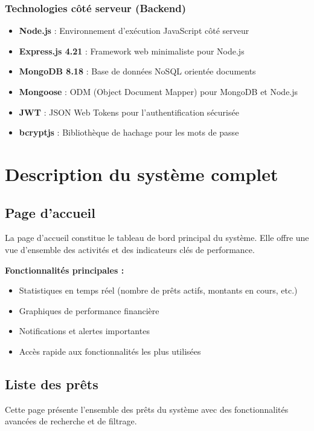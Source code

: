 \documentclass[12pt,a4paper]{report}
\begin{document}
\subsubsection{Technologies côté serveur (Backend)}
\begin{itemize}
    \item \textbf{Node.js} : Environnement d'exécution JavaScript côté serveur
    \item \textbf{Express.js 4.21} : Framework web minimaliste pour Node.js
    \item \textbf{MongoDB 8.18} : Base de données NoSQL orientée documents
    \item \textbf{Mongoose} : ODM (Object Document Mapper) pour MongoDB et Node.js
    \item \textbf{JWT} : JSON Web Tokens pour l'authentification sécurisée
    \item \textbf{bcryptjs} : Bibliothèque de hachage pour les mots de passe
\end{itemize}

\section{Description du système complet}

\subsection{Page d'accueil}

La page d'accueil constitue le tableau de bord principal du système. Elle offre une vue d'ensemble des activités et des indicateurs clés de performance.

\textbf{Fonctionnalités principales :}
\begin{itemize}
    \item Statistiques en temps réel (nombre de prêts actifs, montants en cours, etc.)
    \item Graphiques de performance financière
    \item Notifications et alertes importantes
    \item Accès rapide aux fonctionnalités les plus utilisées
\end{itemize}

\subsection{Liste des prêts}

Cette page présente l'ensemble des prêts du système avec des fonctionnalités avancées de recherche et de filtrage.
\end{document}
